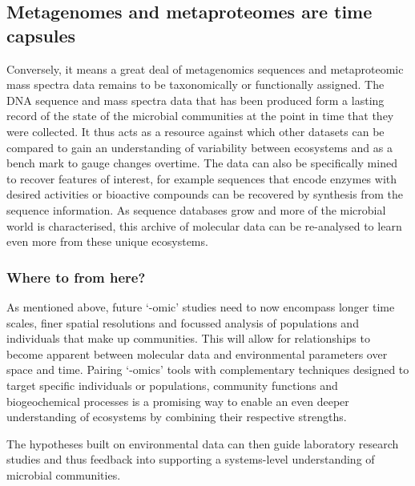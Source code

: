\subsection{Metagenomes and metaproteomes are time capsules}
Conversely, it means a great deal of metagenomics sequences and metaproteomic mass spectra data remains to be taxonomically or functionally assigned.
The \textsc{DNA} sequence and mass spectra data that has been produced form a lasting record of the state of the microbial communities at the point in time that they were collected.
It thus acts as a resource against which other datasets can be compared to gain an understanding of variability between ecosystems and as a bench mark to gauge changes overtime.
The data can also be specifically mined to recover features of interest, for example sequences that encode enzymes with desired activities or bioactive compounds can be recovered by synthesis from the sequence information.
As sequence databases grow and more of the microbial world is characterised, this archive of molecular data can be re-analysed to learn even more from these unique ecosystems.



\subsubsection{Where to from here?}
As mentioned above,
 future `-omic' studies need to now encompass longer time scales, finer spatial resolutions and focussed analysis of populations and individuals that make up communities.
This will allow for relationships to become apparent between molecular data and environmental parameters over space and time.
Pairing `-omics' tools with complementary techniques designed to target specific individuals or populations, community functions and biogeochemical processes is a promising way to enable an even deeper understanding of ecosystems by combining their respective strengths.

The hypotheses built on environmental data can then guide laboratory research studies and thus feedback into supporting a systems-level understanding of microbial communities.

%

